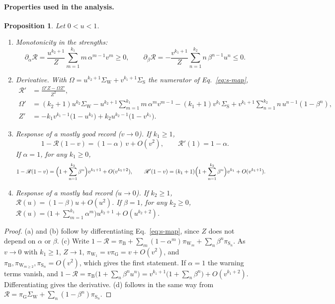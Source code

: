 \documentclass[fleqn,10pt]{wlscirep}
\newcommand{\Rmap}{\mathscr{R}}            %
\newcommand{\st}[1]{\mathrm{#1}}           %
\theoremstyle{plain}
\newtheorem{proposition}[lemma]{Proposition}
\begin{document}
\paragraph{Properties used in the analysis.}
\begin{proposition}\label{prop:properties}
Let $0<u<1$.
\begin{enumerate}
\item[(a)] \textit{Monotonicity in the strengths:}
\begin{equation}
\partial_\alpha\Rmap=\frac{u^{k_2+1}}{Z}\sum_{m=1}^{k_1}m\,\alpha^{m-1}v^m\geq0,\qquad
\partial_\beta\Rmap=-\frac{v^{k_1+1}}{Z}\sum_{n=1}^{k_2}n\,\beta^{n-1}u^n\leq0.
\label{eq:s-monotonicity}
\end{equation}
\item[(b)] \textit{Derivative.} With $\Omega=u^{k_2+1}\Sigma_{\mathrm W}+v^{k_1+1}\Sigma_{\mathrm S}$ the numerator of Eq.~\eqref{eq:s-map},
\begin{equation}
\begin{aligned}
\Rmap'&=\frac{\Omega'Z-\Omega Z'}{Z^2},\\
\Omega'&=(k_2+1)u^{k_2}\Sigma_{\mathrm W}-u^{k_2+1}\sum_{m=1}^{k_1}m\,\alpha^mv^{m-1}-(k_1+1)v^{k_1}\Sigma_{\mathrm S}+v^{k_1+1}\sum_{n=1}^{k_2}n\,u^{n-1}(1-\beta^n),\\
Z'&=-k_1v^{k_1-1}\bigl(1-u^{k_2}\bigr)+k_2u^{k_2-1}\bigl(1-v^{k_1}\bigr).
\end{aligned}
\label{eq:s-derivative}
\end{equation}
\item[(c)] \textit{Response of a mostly good record ($v\to0$).} If $k_1\geq1$,
\begin{equation}
1-\Rmap(1-v)=(1-\alpha)\,v+O(v^2),\qquad \Rmap'(1)=1-\alpha.
\label{eq:s-goodlimit}
\end{equation}
If $\alpha=1$, for any $k_1\geq0$,
\begin{equation}
1-\Rmap(1-v)=\Bigl(1+\sum_{n=1}^{k_2}\beta^n\Bigr)v^{k_1+1}+O(v^{k_1+2}),\qquad
\Rmap'(1-v)=(k_1+1)\Bigl(1+\sum_{n=1}^{k_2}\beta^n\Bigr)v^{k_1}+O(v^{k_1+1}).
\label{eq:s-goodlimit-full}
\end{equation}
\item[(d)] \textit{Response of a mostly bad record ($u\to0$).} If $k_2\geq1$, $\Rmap(u)=(1-\beta)u+O(u^2)$. If $\beta=1$, for any $k_2\geq0$, $\Rmap(u)=\bigl(1+\sum_{m=1}^{k_1}\alpha^m\bigr)u^{k_2+1}+O(u^{k_2+2})$.
\end{enumerate}
\end{proposition}
\begin{proof}
(a) and (b) follow by differentiating Eq.~\eqref{eq:s-map}, since $Z$ does not depend on $\alpha$ or $\beta$. (c) Write $1-\Rmap=\pi_{\st B}+\sum_m(1-\alpha^m)\pi_{\st W_m}+\sum_n\beta^n\pi_{\st S_n}$. As $v\to0$ with $k_1\geq1$, $Z\to1$, $\pi_{\st W_1}=v\pi_{\st G}=v+O(v^2)$, and $\pi_{\st B},\pi_{\st W_{m\geq2}},\pi_{\st S_n}=O(v^2)$, which gives the first statement. If $\alpha=1$ the warning terms vanish, and $1-\Rmap=\pi_{\st B}\bigl(1+\sum_n\beta^nu^n\bigr)=v^{k_1+1}\bigl(1+\sum_n\beta^n\bigr)+O(v^{k_1+2})$. Differentiating gives the derivative. (d) follows in the same way from $\Rmap=\pi_{\st G}\Sigma_{\mathrm W}+\sum_n(1-\beta^n)\pi_{\st S_n}$.
\end{proof}
\end{document}
